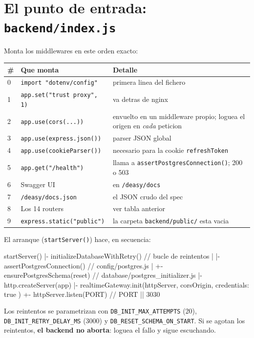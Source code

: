 \documentclass[11pt,a4paper,oneside]{report}
\newcommand{\rt}[1]{\texttt{#1}}
\begin{document}
\section{El punto de entrada: \rt{backend/index.js}}

Monta los middlewares en este orden exacto:

\begin{center}
\footnotesize
\begin{tabularx}{\textwidth}{@{}P{0.8cm}P{5.6cm}L@{}}
\toprule
\textbf{\#} & \textbf{Que monta} & \textbf{Detalle} \\
 & \rt{import "dotenv/config"} & primera linea del fichero \\
1 & \rt{app.set("trust proxy", 1)} & va detras de nginx \\
2 & \rt{app.use(cors(...))} & envuelto en un middleware propio; loguea el origen en \emph{cada} peticion \\
3 & \rt{app.use(express.json())} & parser JSON global \\
4 & \rt{app.use(cookieParser())} & necesario para la cookie \rt{refreshToken} \\
5 & \rt{app.get("/health")} & llama a \rt{assertPostgresConnection()}; 200 o 503 \\
6 & Swagger UI & en \rt{/deasy/docs} \\
7 & \rt{/deasy/docs.json} & el JSON crudo del spec \\
8 & Los 14 routers & ver tabla anterior \\
9 & \rt{express.static("public")} & la carpeta \rt{backend/public/} esta vacia \\
\bottomrule
\end{tabularx}
\end{center}

El arranque (\rt{startServer()}) hace, en secuencia:

\begin{diagrama}
startServer()
 |- initializeDatabaseWithRetry()      // bucle de reintentos
 |    |- assertPostgresConnection()    // config/postgres.js
 |    +- ensurePostgresSchema({reset}) // database/postgres_initializer.js
 |- http.createServer(app)
 |- realtimeGateway.init(httpServer, { corsOrigin, credentials: true })
 +- httpServer.listen(PORT)            // PORT || 3030
\end{diagrama}

Los reintentos se parametrizan con \rt{DB\_INIT\_MAX\_ATTEMPTS} (20),
\rt{DB\_INIT\_RETRY\_DELAY\_MS} (3000) y \rt{DB\_RESET\_SCHEMA\_ON\_START}. Si se agotan los
reintentos, \textbf{el backend no aborta}: loguea el fallo y sigue escuchando.
\end{document}
